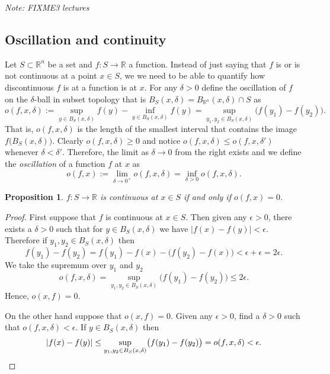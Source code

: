 \documentclass[12pt]{book}
\newcommand{\abs}[1]{\left\lvert {#1} \right\rvert}
\newcommand{\R}{{\mathbb{R}}}
\newcommand{\myindex}[1]{#1\index{#1}}
\newcommand{\sectionnotes}[1]{\noindent \emph{Note: #1} \medskip \par}
\theoremstyle{plain}
\newtheorem{prop}[thm]{Proposition}
\theoremstyle{remark}
\theoremstyle{definition}
\theoremstyle{exercise}
\theoremstyle{example}
\begin{document}
\sectionnotes{FIXME3 lectures}

\subsection{Oscillation and continuity}

Let $S \subset \R^n$ be a set and $f \colon S \to \R$ a function.
Instead of just saying that $f$ is or is not continuous at
a point $x \in S$, we
we need to be able to quantify how discontinuous $f$ is at a function is
at $x$.  For any $\delta > 0$ define the oscillation of 
$f$ on the $\delta$-ball in subset topology that is
$B_S(x,\delta) = B_{\R^n}(x,\delta) \cap S$ as
\begin{equation*}
o(f,x,\delta) :=
{\sup_{y \in B_S(x,\delta)} f(y)}
-
{\inf_{y \in B_S(x,\delta)} f(y)}
= 
\sup_{y_1,y_2 \in B_S(x,\delta)} \bigl(f(y_1)-f(y_2)\bigr) .
\end{equation*}
That is, $o(f,x,\delta)$ is the length of the smallest interval
that contains the image $f\bigl(B_S(x,\delta)\bigr)$.
Clearly $o(f,x,\delta) \geq 0$ and
notice $o(f,x,\delta) \leq o(f,x,\delta')$ whenever $\delta < \delta'$.
Therefore, the limit as $\delta \to 0$ from the right exists and
we define the \emph{\myindex{oscillation}} of a function $f$
at $x$ as
\begin{equation*}
o(f,x) :=
\lim_{\delta \to 0^+}
o(f,x,\delta) =
\inf_{\delta > 0}
o(f,x,\delta) .
\end{equation*}

\begin{prop}
$f \colon S \to \R$ is continuous at $x \in S$ if and only if $o(f,x) = 0$.
\end{prop}

\begin{proof}
First suppose that $f$ is continuous at $x \in S$.  Then given any $\epsilon > 0$,
there exists a $\delta > 0$ such that for $y \in B_S(x,\delta)$
we have $\abs{f(x)-f(y)} < \epsilon$.  Therefore if $y_1,y_2 \in
B_S(x,\delta)$ then
\begin{equation*}
f(y_1)-f(y_2) =
f(y_1)-f(x)-\bigl(f(y_2)-f(x)\bigr) < \epsilon + \epsilon = 2 \epsilon .
\end{equation*}
We take the supremum over $y_1$ and $y_2$
\begin{equation*}
o(f,x,\delta) = 
\sup_{y_1,y_2 \in B_S(x,\delta)} \bigl(f(y_1)-f(y_2)\bigr)
\leq
2 \epsilon .
\end{equation*}
Hence, $o(x,f) = 0$.

On the other hand suppose that $o(x,f) = 0$.  Given any $\epsilon > 0$,
find a $\delta > 0$ such that $o(f,x,\delta) < \epsilon$.  If
$y \in B_S(x,\delta)$ then
\begin{equation*}
\abs{f(x)-f(y)}
\leq
\sup_{y_1,y_2 \in B_S(x,\delta)} \bigl(f(y_1)-f(y_2)\bigr)
=
o(f,x,\delta) < \epsilon. \qedhere
\end{equation*}
\end{proof}
\end{document}
